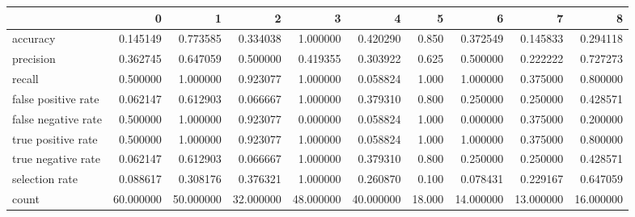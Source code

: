 \begin{tabular}{lrrrrrrrrr}
\toprule
{} &          0 &          1 &          2 &          3 &          4 &       5 &          6 &          7 &          8 \\
\midrule
accuracy            &   0.145149 &   0.773585 &   0.334038 &   1.000000 &   0.420290 &   0.850 &   0.372549 &   0.145833 &   0.294118 \\
precision           &   0.362745 &   0.647059 &   0.500000 &   0.419355 &   0.303922 &   0.625 &   0.500000 &   0.222222 &   0.727273 \\
recall              &   0.500000 &   1.000000 &   0.923077 &   1.000000 &   0.058824 &   1.000 &   1.000000 &   0.375000 &   0.800000 \\
false positive rate &   0.062147 &   0.612903 &   0.066667 &   1.000000 &   0.379310 &   0.800 &   0.250000 &   0.250000 &   0.428571 \\
false negative rate &   0.500000 &   1.000000 &   0.923077 &   0.000000 &   0.058824 &   1.000 &   0.000000 &   0.375000 &   0.200000 \\
true positive rate  &   0.500000 &   1.000000 &   0.923077 &   1.000000 &   0.058824 &   1.000 &   1.000000 &   0.375000 &   0.800000 \\
true negative rate  &   0.062147 &   0.612903 &   0.066667 &   1.000000 &   0.379310 &   0.800 &   0.250000 &   0.250000 &   0.428571 \\
selection rate      &   0.088617 &   0.308176 &   0.376321 &   1.000000 &   0.260870 &   0.100 &   0.078431 &   0.229167 &   0.647059 \\
count               &  60.000000 &  50.000000 &  32.000000 &  48.000000 &  40.000000 &  18.000 &  14.000000 &  13.000000 &  16.000000 \\
\bottomrule
\end{tabular}
